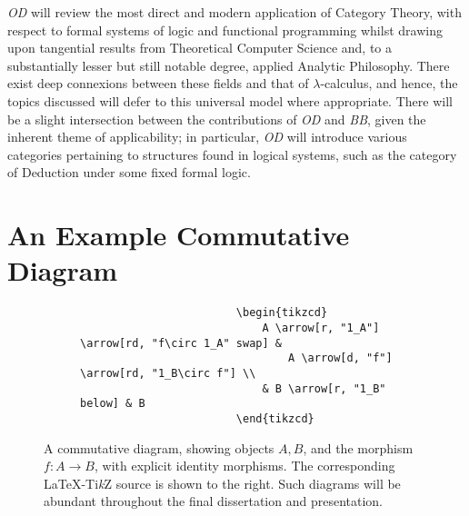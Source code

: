 \documentclass{article}
\begin{document}
\begin{itemize}
        \textit{OD} will review the most direct and modern application of
        Category Theory, with respect to formal systems of logic and functional
        programming whilst drawing upon tangential results from Theoretical
        Computer Science and, to a substantially lesser but still notable
        degree, applied Analytic Philosophy. There exist deep connexions between
        these fields and that of $\lambda$-calculus, and hence, the topics
        discussed will defer to this universal model where appropriate. There
        will be a slight intersection between the contributions of \textit{OD}
        and \textit{BB}, given the inherent theme of applicability; in
        particular, \textit{OD} will introduce various categories pertaining to
        structures found in logical systems, such as the category of Deduction
        under some fixed formal logic.
\end{itemize}
%
\pagebreak %
\printbibliography[title={Supporting Works of Reference\\[-.5em]}]
\section*{An Example Commutative Diagram}
\begin{figure}[h!]
        \centering
        \begin{subfigure}{.31\linewidth}
        \end{subfigure}\hfill%
        \begin{subfigure}{.61\linewidth}
                \begin{lstlisting}
                        \begin{tikzcd}
                            A \arrow[r, "1_A"] \arrow[rd, "f\circ 1_A" swap] &
                                A \arrow[d, "f"] \arrow[rd, "1_B\circ f"] \\
                            & B \arrow[r, "1_B" below] & B
                        \end{tikzcd}
                \end{lstlisting}
        \end{subfigure}
        \caption{A commutative diagram, showing objects $A,B$, and the morphism
        $f:A\longrightarrow B$, with explicit identity morphisms. The
        corresponding \LaTeX-Ti\textit{k}Z source is shown to the right. Such
        diagrams will be abundant throughout the final dissertation and
        presentation.}
\end{figure}
%
\end{document}
